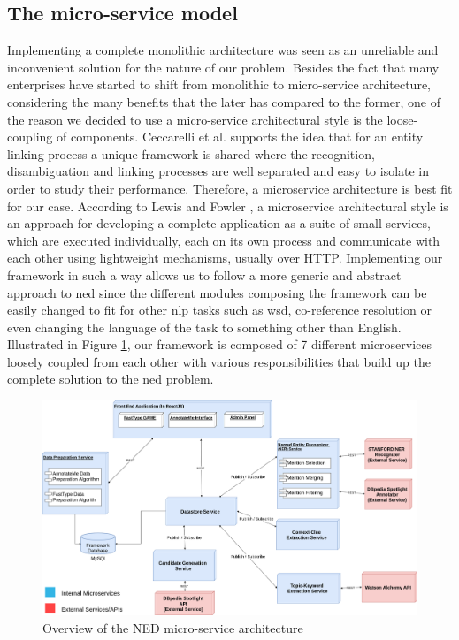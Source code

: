 \subsection{The micro-service model}
Implementing a complete monolithic architecture was seen as an unreliable and inconvenient solution for the nature of our problem. Besides the fact that many enterprises have started to shift from monolithic to micro-service architecture, considering the many benefits that the later has compared to the former, one of the reason we decided to use a micro-service architectural style is the loose-coupling of components. Ceccarelli et al. \cite{3} supports the idea that for an entity linking process a unique framework is shared where the recognition, disambiguation and linking processes are well separated and easy to isolate in order to study their performance. Therefore, a microservice architecture is best fit for our case. According to Lewis and Fowler \cite{martinfowler}, a microservice architectural style is an approach for developing a complete application as a suite of small services, which are executed individually, each on its own process and communicate with each other using lightweight mechanisms, usually over HTTP. Implementing our framework in such a way allows us to follow a more generic and abstract approach to \ac{ned} since the different modules composing the framework can be easily changed to fit for other \ac{nlp} tasks such as \ac{wsd}, co-reference resolution or even changing the language of the task to something other than English. Illustrated in Figure \ref{fig:microservice_architecture}, our framework is composed of 7 different microservices loosely coupled from each other with various responsibilities that build up the complete solution to the \ac{ned} problem.
\newpage 

\begin{figure}[]
  \includegraphics[width=\linewidth]{figures/microservice-architecture.png}
  \caption{Overview of the NED micro-service architecture}
  \label{fig:microservice_architecture}
\end{figure}

